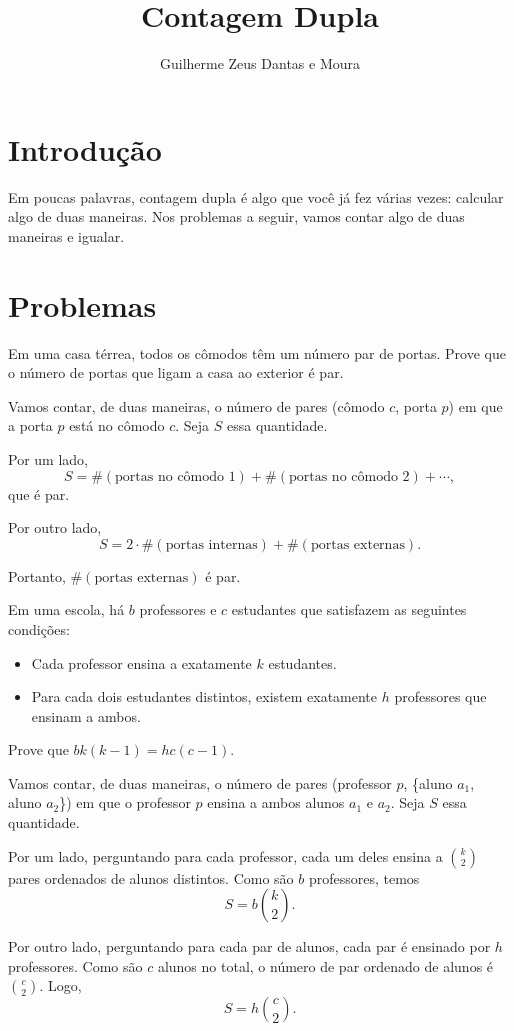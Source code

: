\documentclass[10pt, a4paper]{article}
\title{Contagem Dupla}
\author{Guilherme Zeus Dantas e Moura}
\begin{document}
	
	\zeustitle

	\section{Introdução}

	Em poucas palavras, contagem dupla é algo que você já fez várias vezes: calcular algo de duas maneiras. Nos problemas a seguir, vamos contar algo de duas maneiras e igualar.

	\section{Problemas}

	\begin{prob} %
		Em uma casa térrea, todos os cômodos têm um número par de portas. Prove que o número de portas que ligam a casa ao exterior é par.	
	\end{prob}

	\begin{sol}
		Vamos contar, de duas maneiras, o número de pares (cômodo $c$, porta $p$) em que a porta $p$ está no cômodo $c$. Seja $S$ essa quantidade.
	
		Por um lado, \[S = \#(\text{portas no cômodo\ }1) + \#(\text{portas no cômodo\ }2) + \cdots,\] que é par.
	
		Por outro lado, \[S = 2 \cdot \#(\text{portas internas}) + \#(\text{portas externas}).\]

		Portanto, $\#(\text{portas externas})$ é par.
	\end{sol}

	\begin{prob} %
		Em uma escola, há $b$ professores e $c$ estudantes que satisfazem as seguintes condições:
		
		\begin{itemize}
			\item Cada professor ensina a exatamente $k$ estudantes.
			\item Para cada dois estudantes distintos, existem exatamente $h$ professores que ensinam a ambos.
		\end{itemize}

		Prove que $bk(k-1) = hc(c-1)$.
	\end{prob}

	\begin{sol}
		Vamos contar, de duas maneiras, o número de pares (professor $p$, \{aluno $a_1$, aluno $a_2$\}) em que o professor $p$ ensina a ambos alunos $a_1$ e $a_2$. Seja $S$ essa quantidade.
	
			Por um lado, perguntando para cada professor, cada um deles ensina a $\binom{k}{2}$ pares ordenados de alunos distintos. Como são $b$ professores, temos \[S = b\binom{k}{2}.\]
	
			Por outro lado, perguntando para cada par de alunos, cada par é ensinado por $h$ professores. Como são $c$ alunos no total, o número de par ordenado de alunos é $\binom{c}{2}$. Logo, \[S = h\binom{c}{2}.\]
	\end{sol}
\end{document}
